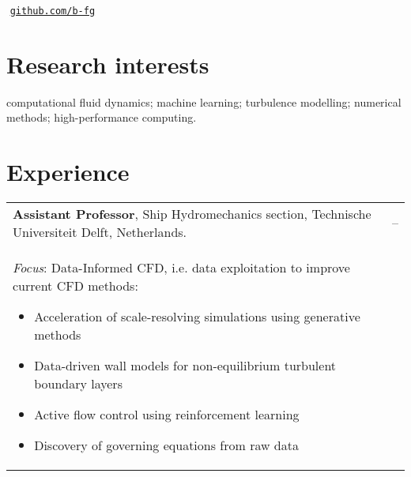 \documentclass[line]{res}
\newenvironment{p1}
{\begin{adjustwidth}{-30pt}{0pt}
\vspace{8pt}}
{\end{adjustwidth}}
\newenvironment{p11}
{\begin{adjustwidth}{-25pt}{0pt}
\vspace{8pt}}
{\end{adjustwidth}}
\begin{document}



\begin{resume}
\section{}
\vspace{-15pt}
\\
\hspace*{0pt}\hfill\,\,\href{https://github.com/b-fg}{\texttt{github.com/b-fg}}\\
\vspace{-25pt}
\noindent

\section{Research interests}
\begin{p11}
computational fluid dynamics; machine learning; turbulence modelling; numerical methods; high-performance computing.
\end{p11}

\section{Experience}

\begin{p1}
\begin{tabular}{p{} >{\raggedleft\arraybackslash}p{}}
	\textbf{Assistant Professor}, Ship Hydromechanics section, Technische Universiteit Delft, Netherlands. & 2024--\\
	\textit{Focus}: Data-Informed CFD, i.e. data exploitation to improve current CFD methods:
	\begin{itemize}
		\item Acceleration of scale-resolving simulations using generative methods
		\item Data-driven wall models for non-equilibrium turbulent boundary layers
		\item Active flow control using reinforcement learning
		\item Discovery of governing equations from raw data
	\end{itemize}
\end{tabular}


\end{p1}
\end{resume}
\end{document}
